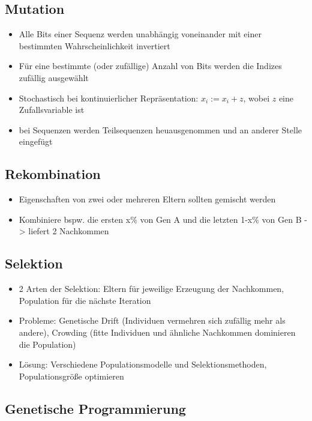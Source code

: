 \documentclass[paper=a4, fontsize=11pt]{scrartcl} %
\numberwithin{equation}{section} %
\numberwithin{figure}{section} %
\numberwithin{table}{section} %
\begin{document}
\subsection{Mutation}

\begin{itemize}
\item Alle Bits einer Sequenz werden unabhängig voneinander mit einer bestimmten Wahrscheinlichkeit invertiert
\item Für eine bestimmte (oder zufällige) Anzahl von Bits werden die Indizes zufällig ausgewählt
\item Stochastisch bei kontinuierlicher Repräsentation: $x_i := x_i + z$, wobei $z$ eine Zufallsvariable ist
\item bei Sequenzen werden Teilsequenzen heuausgenommen und an anderer Stelle eingefügt
\end{itemize}

\subsection{Rekombination}

\begin{itemize}
\item Eigenschaften von zwei oder mehreren Eltern sollten gemischt werden
\item Kombiniere bspw. die ersten x\% von Gen A und die letzten 1-x\% von Gen B -> liefert 2 Nachkommen
\end{itemize}

\subsection{Selektion}

\begin{itemize}
\item 2 Arten der Selektion: Eltern für jeweilige Erzeugung der Nachkommen, Population für die nächste Iteration
\item Probleme: Genetische Drift (Individuen vermehren sich zufällig mehr als andere), Crowding (fitte Individuen und ähnliche Nachkommen dominieren die Population)
\item Lösung: Verschiedene Populationsmodelle und Selektionsmethoden, Populationsgröße optimieren
\end{itemize}

\subsection{Genetische Programmierung}
\end{document}
